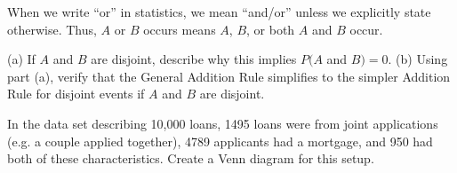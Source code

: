 \begin{tipBox}{
When we write ``or'' in statistics, we mean ``and/or'' unless we explicitly state otherwise. Thus, $A$ or $B$ occurs means $A$, $B$, or both $A$ and $B$ occur.}
\end{tipBox}

\begin{exercisewrap}
\begin{nexercise}
(a) If $A$ and $B$ are disjoint, describe why this implies $P(A$ and $B) = 0$. (b) Using part (a), verify that the General Addition Rule simplifies to the simpler Addition Rule for disjoint events if $A$ and $B$ are disjoint.\footnotemark
\end{nexercise}
\end{exercisewrap}


\begin{exercisewrap}
\begin{nexercise}\label{emailSpamNumberVennExer}
In the  data set describing 10,000 loans,
1495 loans were from joint applications
(e.g. a couple applied together),
4789 applicants had a mortgage,
and 950 had both of these characteristics.
Create a Venn diagram for this setup.\footnotemark
\end{nexercise}
\end{exercisewrap}


